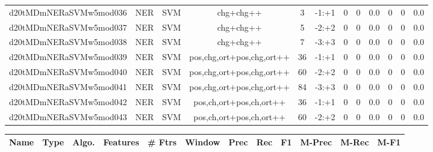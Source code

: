 \documentclass[a4paper]{article}
\begin{document}
\begin{landscape}
\begin{center}
\begin{tabular}{ |c|c|c|c|c|c|c|c|c|c|c|c|}
 
 	
 	\small{ d20tMDmNERaSVMw5mod036 } & \small{ NER} & \small{  SVM }  & chg+chg++  &  3 &  \small{  -1:+1 }  &  0 & 0 & 0.0  &  0 & 0 & 0.0 \\
 	

 
 	
 	\small{ d20tMDmNERaSVMw5mod037 } & \small{ NER} & \small{  SVM }  & chg+chg++  &  5 &  \small{  -2:+2 }  &  0 & 0 & 0.0  &  0 & 0 & 0.0 \\
 	

 
 	
 	\small{ d20tMDmNERaSVMw5mod038 } & \small{ NER} & \small{  SVM }  & chg+chg++  &  7 &  \small{  -3:+3 }  &  0 & 0 & 0.0  &  0 & 0 & 0.0 \\
 	

 
 	
 	\small{ d20tMDmNERaSVMw5mod039 } & \small{ NER} & \small{  SVM }  & pos,chg,ort+pos,chg,ort++  &  36 &  \small{  -1:+1 }  &  0 & 0 & 0.0  &  0 & 0 & 0.0 \\
 	

 
 	
 	\small{ d20tMDmNERaSVMw5mod040 } & \small{ NER} & \small{  SVM }  & pos,chg,ort+pos,chg,ort++  &  60 &  \small{  -2:+2 }  &  0 & 0 & 0.0  &  0 & 0 & 0.0 \\
 	

 
 	
 	\small{ d20tMDmNERaSVMw5mod041 } & \small{ NER} & \small{  SVM }  & pos,chg,ort+pos,chg,ort++  &  84 &  \small{  -3:+3 }  &  0 & 0 & 0.0  &  0 & 0 & 0.0 \\
 	

 
 	
 	\small{ d20tMDmNERaSVMw5mod042 } & \small{ NER} & \small{  SVM }  & pos,ch,ort+pos,ch,ort++  &  36 &  \small{  -1:+1 }  &  0 & 0 & 0.0  &  0 & 0 & 0.0 \\
 	

 
 	
 	\small{ d20tMDmNERaSVMw5mod043 } & \small{ NER} & \small{  SVM }  & pos,ch,ort+pos,ch,ort++  &  60 &  \small{  -2:+2 }  &  0 & 0 & 0.0  &  0 & 0 & 0.0 \\
 	
 \hline
\end{tabular}
\end{center}




\begin{center}
\begin{tabular}{ |c|c|c|c|c|c|c|c|c|c|c|c|} 
 \hline
 	Name & Type & Algo. & Features & \# Ftrs & Window & Prec & Rec & F1 & M-Prec & M-Rec & M-F1\\
 \hline


\end{tabular}
\end{center}
\end{landscape}
\end{document}
